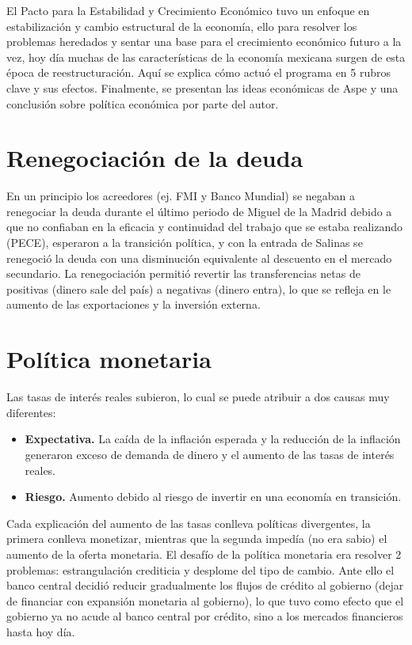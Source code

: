 El Pacto para la Estabilidad y Crecimiento Económico tuvo un enfoque en estabilización y cambio estructural de la economía, ello para resolver los problemas heredados y sentar una base para el crecimiento económico futuro a la vez, hoy día muchas de las características de la economía mexicana surgen de esta época de reestructuración.
Aquí se explica cómo actuó el programa en 5 rubros clave y sus efectos. Finalmente, se presentan las ideas económicas de Aspe y una conclusión sobre política económica por parte del autor.

\section{Renegociación de la deuda}
En un principio los acreedores (ej. FMI y Banco Mundial) se negaban a renegociar la deuda durante el último periodo de Miguel de la Madrid debido a que no confiaban en la eficacia y continuidad del trabajo que se estaba realizando (PECE), esperaron a la transición política, y con la entrada de Salinas se renegoció la deuda con una disminución equivalente al descuento en el mercado secundario. La renegociación permitió revertir las transferencias netas de positivas (dinero sale del país) a negativas (dinero entra), lo que se refleja en le aumento de las exportaciones y la inversión externa.

\section{Política monetaria}
Las tasas de interés reales subieron, lo cual se puede atribuir a dos causas muy diferentes:
\begin{itemize}
    \item \textbf{Expectativa.} La caída de la inflación esperada y la reducción de la inflación generaron exceso de demanda de dinero y el aumento de las tasas de interés reales.
    \item \textbf{Riesgo.} Aumento debido al riesgo de invertir en una economía en transición.
\end{itemize}

Cada explicación del aumento de las tasas conlleva políticas divergentes, la primera conlleva monetizar, mientras que la segunda impedía (no era sabio) el aumento de la oferta monetaria. 
El desafío de la política monetaria era resolver 2 problemas: estrangulación crediticia y desplome del tipo de cambio.
Ante ello el banco central decidió reducir gradualmente los flujos de crédito al gobierno (dejar de financiar con expansión monetaria al gobierno), lo que tuvo como efecto que el gobierno ya no acude al banco central por crédito, sino a los mercados financieros hasta hoy día.

